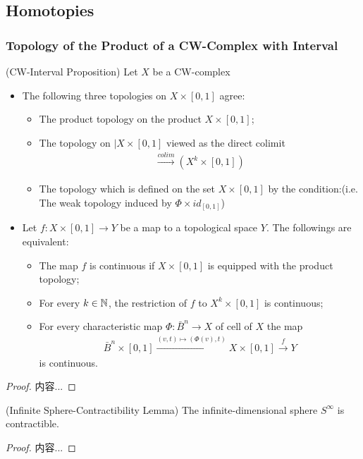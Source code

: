 \documentclass[Total.tex]{subfiles}
\begin{document}
	\subsection{Homotopies}
		\subsubsection{Topology of the Product of a CW-Complex with Interval}
			\begin{proposition}
				(CW-Interval Proposition) Let $X$ be a CW-complex
				\begin{itemize}
					\item The following three topologies on $X\times [0,1]$ agree:
					\begin{itemize}
						\item The product topology on the product $X\times [0,1]$;
						\item The topology on $|X\times [0,1]$ viewed as the direct colimit
						\begin{gather*}
							\stackrel{colim}{\rightarrow} (X^k\times [0,1])
						\end{gather*}
						\item The topology which is defined on the set $X\times [0,1]$ by the condition:(i.e. The weak topology induced by $\Phi\times id_{[0,1]}$)
					\end{itemize}
					\item Let $f:X\times [0,1]\rightarrow Y$ be a map to a topological space $Y$. The followings are equivalent:
					\begin{itemize}
						\item The map $f$ is continuous if $X\times [0,1]$ is equipped with the product topology;
						\item For every $k\in \mathbb{N}$, the restriction of $f$ to $X^k\times [0,1]$ is continuous;
						\item For every characteristic map $\Phi:\bar{B}^n\rightarrow X$ of cell of $X$ the map
						\begin{gather*}
							\bar{B}^n\times [0,1]\stackrel{(v,t)\mapsto (\Phi(v),t)}{\rightarrow}X\times [0,1]\stackrel{f}{\rightarrow} Y
						\end{gather*}
						is continuous.
					\end{itemize}
				\end{itemize}
			\end{proposition}
			\begin{proof}
				内容...
			\end{proof}
			\begin{lemma}
				(Infinite Sphere-Contractibility Lemma) The infinite-dimensional sphere $S^\infty$ is contractible.
			\end{lemma}
			\begin{proof}
				内容...
			\end{proof}
\end{document}
